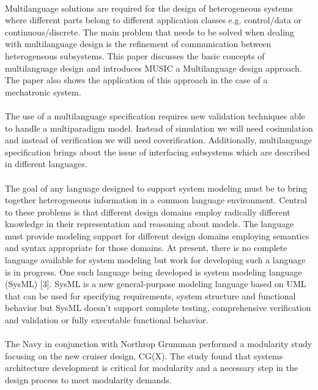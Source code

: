 \documentclass[a4paper,12pt,twoside]{report}
\begin{document}
{			\paragraph{} {Multilanguage solutions are required for the design of heterogeneous systems where different parts belong to different application classes e.g. control/data or continuous/discrete. The main problem that needs to be solved when dealing with multilanguage design is the refinement of communication between heterogeneous subsystems. This paper discusses the basic concepts of multilanguage design and introduces MUSIC a Multilanguage design approach. The paper also shows the application of this approach in the case of a mechatronic system. \cite{MultilanguageDesignHeterogeneousSystems}
			}
		
			\paragraph{}{The use of a multilanguage specification requires new validation techniques able to handle a multiparadigm model. Instead of simulation we will need cosimulation and instead of verification we will need coverification. Additionally, multilanguage specification brings about the issue of interfacing subsystems which are described in different languages. \cite{SMWirelessSensorNetwork}
			}
		
			\paragraph{} {The goal of any language designed to support system modeling must be to bring together heterogeneous information in a common language environment. Central to these problems is that different design domains employ radically different knowledge in their representation and reasoning about models. The language must provide modeling support for different design domains employing semantics and syntax appropriate for those domains. At present, there is no complete language available for system modeling but work for developing such a language is in progress. One such language being developed is system modeling language (SysML) [3]. SysML is a new general-purpose modeling language based on UML that can be used for specifying requirements, system structure and functional behavior but SysML doesn’t support complete testing, comprehensive verification and validation or fully executable functional behavior. \cite{SMWirelessSensorNetwork}
			}
			
			\paragraph{} {The Navy in conjunction with Northrop Grumman performed a modularity study focusing on the new cruiser design, CG(X). The study found that systems architecture development is critical for modularity and a necessary step in the design process to meet modularity demands. \cite{MBSESystemArchitectureNavalShipDesign}
			}
			
}
\end{document}
